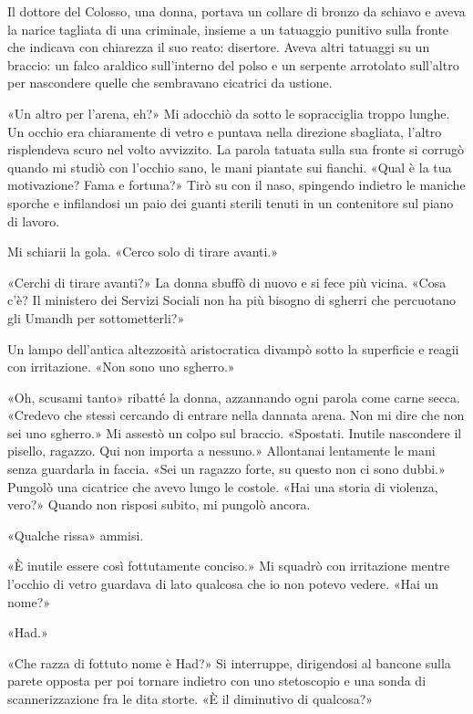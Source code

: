 Il dottore del Colosso, una donna, portava un collare di bronzo da
schiavo e aveva la narice tagliata di una criminale, insieme a un
tatuaggio punitivo sulla fronte che indicava con chiarezza il suo reato:
\foreignlanguage{italian}{disertore}. Aveva altri tatuaggi su un
braccio: un falco araldico sull'interno del polso e un serpente
arrotolato sull'altro per nascondere quelle che sembravano cicatrici da
ustione.

«Un altro per l'arena, eh?» Mi adocchiò da sotto le sopracciglia troppo
lunghe. Un occhio era chiaramente di vetro e puntava nella direzione
sbagliata, l'altro risplendeva scuro nel volto avvizzito. La parola
tatuata sulla sua fronte si corrugò quando mi studiò con l'occhio sano,
le mani piantate sui fianchi. «Qual è la tua motivazione? Fama e
fortuna?» Tirò su con il naso, spingendo indietro le maniche sporche e
infilandosi un paio dei guanti sterili tenuti in un contenitore sul
piano di lavoro.

Mi schiarii la gola. «Cerco solo di tirare avanti.»

«Cerchi di tirare avanti?» La donna sbuffò di nuovo e si fece più
vicina. «Cosa c'è? Il ministero dei Servizi Sociali non ha più bisogno
di sgherri che percuotano gli Umandh per sottometterli?»

Un lampo dell'antica altezzosità aristocratica divampò sotto la
superficie e reagii con irritazione. «Non sono uno sgherro.»

«Oh, scusami tanto» ribatté la donna, azzannando ogni parola come carne
secca. «Credevo che stessi cercando di entrare nella dannata arena. Non
mi dire che non sei uno sgherro.» Mi assestò un colpo sul braccio.
«Spostati. Inutile nascondere il pisello, ragazzo. Qui non importa a
nessuno.» Allontanai lentamente le mani senza guardarla in faccia. «Sei
un ragazzo forte, su questo non ci sono dubbi.» Pungolò una cicatrice
che avevo lungo le costole. «Hai una storia di violenza, vero?» Quando
non risposi subito, mi pungolò ancora.

«Qualche rissa» ammisi.

«È inutile essere così fottutamente conciso.» Mi squadrò con irritazione
mentre l'occhio di vetro guardava di lato qualcosa che io non potevo
vedere. «Hai un nome?»

«Had.»

«Che razza di fottuto nome è Had?» Si interruppe, dirigendosi al bancone
sulla parete opposta per poi tornare indietro con uno stetoscopio e una
sonda di scannerizzazione fra le dita storte. «È il diminutivo di
qualcosa?»

